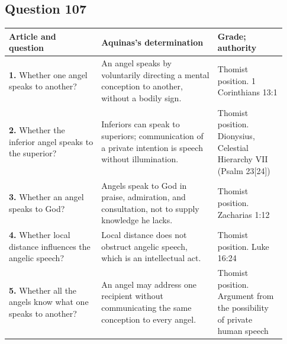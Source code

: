 \subsection{Question 107}
\begin{longtable}{@{}>{\raggedright\arraybackslash}p{0.31\linewidth}>{\raggedright\arraybackslash}p{0.39\linewidth}>{\raggedright\arraybackslash}p{0.23\linewidth}@{}}
\toprule
Article and question & Aquinas's determination & Grade; authority\\
\midrule\endhead
\textbf{1.} Whether one angel speaks to another? & An angel speaks by voluntarily directing a mental conception to another, without a bodily sign. & Thomist position. 1 Corinthians 13:1\\
\textbf{2.} Whether the inferior angel speaks to the superior? & Inferiors can speak to superiors; communication of a private intention is speech without illumination. & Thomist position. Dionysius, Celestial Hierarchy VII (Psalm 23[24])\\
\textbf{3.} Whether an angel speaks to God? & Angels speak to God in praise, admiration, and consultation, not to supply knowledge he lacks. & Thomist position. Zacharias 1:12\\
\textbf{4.} Whether local distance influences the angelic speech? & Local distance does not obstruct angelic speech, which is an intellectual act. & Thomist position. Luke 16:24\\
\textbf{5.} Whether all the angels know what one speaks to another? & An angel may address one recipient without communicating the same conception to every angel. & Thomist position. Argument from the possibility of private human speech\\
\bottomrule
\end{longtable}

